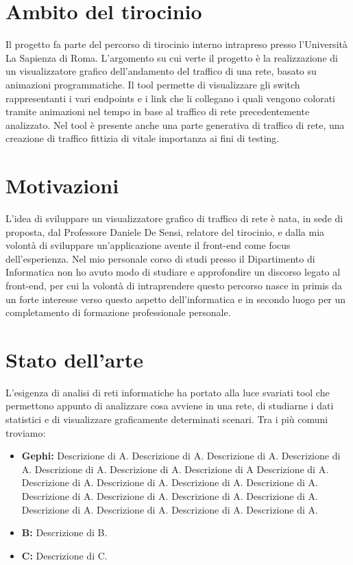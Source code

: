 \documentclass[binding=0.6cm]{sapthesis}
\begin{document}
\section{Ambito del tirocinio}
Il progetto fa parte del percorso di tirocinio interno intrapreso presso l'Università La Sapienza di Roma. L'argomento su cui verte il progetto
è la realizzazione di un visualizzatore grafico dell'andamento del traffico di una rete, basato
su animazioni programmatiche. Il tool permette di visualizzare gli switch rappresentanti 
i vari endpoints e i link
che li collegano i quali vengono colorati tramite animazioni nel tempo in base al traffico di 
rete precedentemente analizzato. Nel tool è presente anche una parte generativa di traffico di rete,
una creazione di traffico fittizia di vitale importanza ai fini di testing.
\section{Motivazioni}
L'idea di sviluppare un visualizzatore grafico di traffico di rete è nata, 
in sede di proposta, dal Professore Daniele De Sensi, relatore del tirocinio, e dalla mia volontà di sviluppare un'applicazione avente il front-end
come focus dell'esperienza. Nel mio personale corso di studi presso il Dipartimento di Informatica non ho avuto modo
di studiare e approfondire un discorso legato al front-end, per cui la volontà di intraprendere questo percorso
nasce in primis da un forte interesse verso questo aspetto dell'informatica e in secondo luogo per un completamento di formazione professionale personale.
\section{Stato dell'arte}
L'esigenza di analisi di reti informatiche ha portato alla luce svariati tool che permettono
appunto di analizzare cosa avviene in una rete, di studiarne i dati statistici e di visualizzare
graficamente determinati scenari. Tra i più comuni troviamo:




\begin{itemize}
  \item \textbf{Gephi:}
   Descrizione di A. Descrizione di A. Descrizione di A. Descrizione di A. Descrizione di A. Descrizione di A. Descrizione di A
   Descrizione di A. Descrizione di A. Descrizione di A. Descrizione di A. Descrizione di A. Descrizione di A. Descrizione di A. Descrizione di A.
   Descrizione di A. Descrizione di A. Descrizione di A. Descrizione di A. Descrizione di A.
  \item \textbf{B:} Descrizione di B.
  \item \textbf{C:} Descrizione di C.
\end{itemize}
\end{document}

